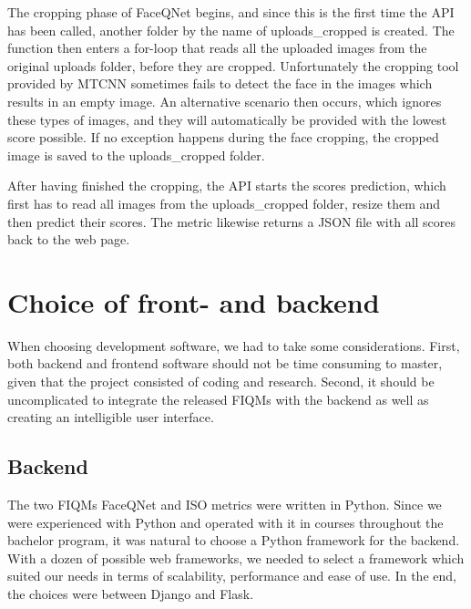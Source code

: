 The cropping phase of FaceQNet begins, and since this is the first time the API has been called, another folder by the name of uploads\_cropped is created. The function then enters a for-loop that reads all the uploaded images from the original uploads folder, before they are cropped. Unfortunately the cropping tool provided by MTCNN sometimes fails to detect the face in the images which results in an empty image. An alternative scenario then occurs, which ignores these types of images, and they will automatically be provided with the lowest score possible. If no exception happens during the face cropping, the cropped image is saved to the uploads\_cropped folder.  

After having finished the cropping, the API starts the scores prediction, which first has to read all images from the uploads\_cropped folder, resize them and then predict their scores. The metric likewise returns a JSON file with all scores back to the web page. 

\section{Choice of front- and backend}
When choosing development software, we had to take some considerations. First, both backend and frontend software should not be time consuming to master, given that the project consisted of coding and research. Second, it should be uncomplicated to integrate the released FIQMs with the backend as well as creating an intelligible user interface. 

\subsection*{Backend}
The two FIQMs FaceQNet and ISO metrics were written in Python. Since we were experienced with Python and operated with it in courses throughout the bachelor program, it was natural to choose a Python framework for the backend. With a dozen of possible web frameworks, we needed to select a framework which suited our needs in terms of scalability, performance and ease of use. In the end, the choices were between Django and Flask. 

\newpage

